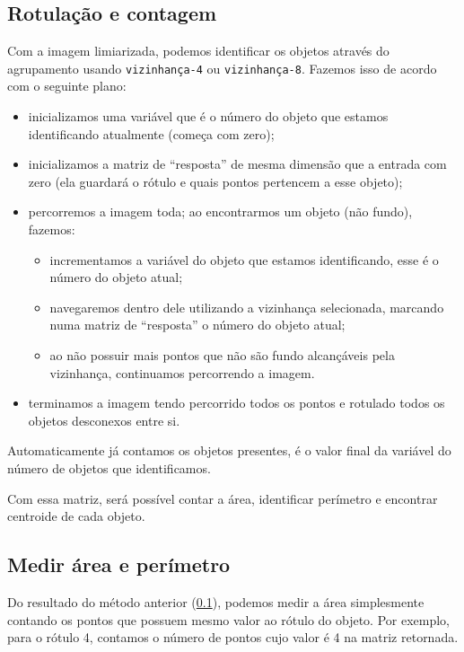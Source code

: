 \documentclass[brazilian,a4paper,twocolumn]{article}
\begin{document}
    \subsection{Rotulação e contagem}
    \label{sec:metodo-rotulacao}

        Com a imagem limiarizada, podemos identificar os objetos através do agrupamento usando \texttt{vizinhança-4} ou \texttt{vizinhança-8}. Fazemos isso de acordo com o seguinte plano:
        \begin{itemize}
            \item inicializamos uma variável que é o número do objeto que estamos identificando atualmente (começa com zero);
            \item inicializamos a matriz de ``resposta'' de mesma dimensão que a entrada com zero (ela guardará o rótulo e quais pontos pertencem a esse objeto);
            \item percorremos a imagem toda; ao encontrarmos um objeto (não fundo), fazemos:
            \begin{itemize}
                \item incrementamos a variável do objeto que estamos identificando, esse é o número do objeto atual;
                \item navegaremos dentro dele utilizando a vizinhança selecionada, marcando numa matriz de ``resposta'' o número do objeto atual;
                \item ao não possuir mais pontos que não são fundo alcançáveis pela vizinhança, continuamos percorrendo a imagem.
            \end{itemize}
            \item terminamos a imagem tendo percorrido todos os pontos e rotulado todos os objetos desconexos entre si.
        \end{itemize}

        Automaticamente já contamos os objetos presentes, é o valor final da variável do número de objetos que identificamos.

        Com essa matriz, será possível contar a área, identificar perímetro e encontrar centroide de cada objeto.

    \subsection{Medir área e perímetro}

        Do resultado do método anterior (\ref{sec:metodo-rotulacao}), podemos medir a área simplesmente contando os pontos que possuem mesmo valor ao rótulo do objeto. Por exemplo, para o rótulo 4, contamos o número de pontos cujo valor é 4 na matriz retornada.
\end{document}
